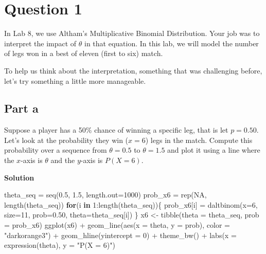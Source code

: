 \documentclass[
]{article}
\newenvironment{Shaded}{\begin{snugshade}}{\end{snugshade}}
\newcommand{\AttributeTok}[1]{\textcolor[rgb]{0.40,0.45,0.13}{#1}}
\newcommand{\ConstantTok}[1]{\textcolor[rgb]{0.56,0.35,0.01}{#1}}
\newcommand{\ControlFlowTok}[1]{\textcolor[rgb]{0.00,0.23,0.31}{\textbf{#1}}}
\newcommand{\DecValTok}[1]{\textcolor[rgb]{0.68,0.00,0.00}{#1}}
\newcommand{\FloatTok}[1]{\textcolor[rgb]{0.68,0.00,0.00}{#1}}
\newcommand{\FunctionTok}[1]{\textcolor[rgb]{0.28,0.35,0.67}{#1}}
\newcommand{\NormalTok}[1]{\textcolor[rgb]{0.00,0.23,0.31}{#1}}
\newcommand{\OtherTok}[1]{\textcolor[rgb]{0.00,0.23,0.31}{#1}}
\newcommand{\SpecialCharTok}[1]{\textcolor[rgb]{0.37,0.37,0.37}{#1}}
\newcommand{\StringTok}[1]{\textcolor[rgb]{0.13,0.47,0.30}{#1}}
\begin{document}
\normalsize

\section{Question 1}\label{question-1}

In Lab 8, we use Altham's Multiplicative Binomial Distribution. Your job
was to interpret the impact of \(\theta\) in that equation. In this lab,
we will model the number of legs won in a best of eleven (first to six)
match.

To help us think about the interpretation, something that was
challenging before, let's try something a little more manageable.

\subsection{Part a}\label{part-a}

Suppose a player has a 50\% chance of winning a specific leg, that is
let \(p=0.50\). Let's look at the probability they win (\(x=6\)) legs in
the match. Compute this probability over a sequence from \(\theta=0.5\)
to \(\theta=1.5\) and plot it using a line where the \(x\)-axis is
\(\theta\) and the \(y\)-axis is \(P(X=6)\).

\textbf{Solution}

\normalsize

\begin{Shaded}
\begin{Highlighting}[numbers=left,,]
\NormalTok{theta\_seq }\OtherTok{=} \FunctionTok{seq}\NormalTok{(}\FloatTok{0.5}\NormalTok{, }\FloatTok{1.5}\NormalTok{, }\AttributeTok{length.out=}\DecValTok{1000}\NormalTok{)}
\NormalTok{prob\_x6 }\OtherTok{=} \FunctionTok{rep}\NormalTok{(}\ConstantTok{NA}\NormalTok{, }\FunctionTok{length}\NormalTok{(theta\_seq))}
\ControlFlowTok{for}\NormalTok{(i }\ControlFlowTok{in} \DecValTok{1}\SpecialCharTok{:}\FunctionTok{length}\NormalTok{(theta\_seq))\{}
\NormalTok{  prob\_x6[i] }\OtherTok{=} \FunctionTok{daltbinom}\NormalTok{(}\AttributeTok{x=}\DecValTok{6}\NormalTok{, }\AttributeTok{size=}\DecValTok{11}\NormalTok{, }\AttributeTok{prob=}\FloatTok{0.50}\NormalTok{, }\AttributeTok{theta=}\NormalTok{theta\_seq[i])}
\NormalTok{\}}
\NormalTok{x6 }\OtherTok{\textless{}{-}} \FunctionTok{tibble}\NormalTok{(}\AttributeTok{theta =}\NormalTok{ theta\_seq,}
            \AttributeTok{prob  =}\NormalTok{ prob\_x6)}
\FunctionTok{ggplot}\NormalTok{(x6) }\SpecialCharTok{+}
  \FunctionTok{geom\_line}\NormalTok{(}\FunctionTok{aes}\NormalTok{(}\AttributeTok{x =}\NormalTok{ theta, }\AttributeTok{y =}\NormalTok{ prob), }\AttributeTok{color =} \StringTok{"darkorange3"}\NormalTok{) }\SpecialCharTok{+}
  \FunctionTok{geom\_hline}\NormalTok{(}\AttributeTok{yintercept =} \DecValTok{0}\NormalTok{) }\SpecialCharTok{+}
  \FunctionTok{theme\_bw}\NormalTok{() }\SpecialCharTok{+}
  \FunctionTok{labs}\NormalTok{(}\AttributeTok{x =} \FunctionTok{expression}\NormalTok{(theta), }\AttributeTok{y =} \StringTok{"P(X = 6)"}\NormalTok{)}
\end{Highlighting}
\end{Shaded}
\end{document}
